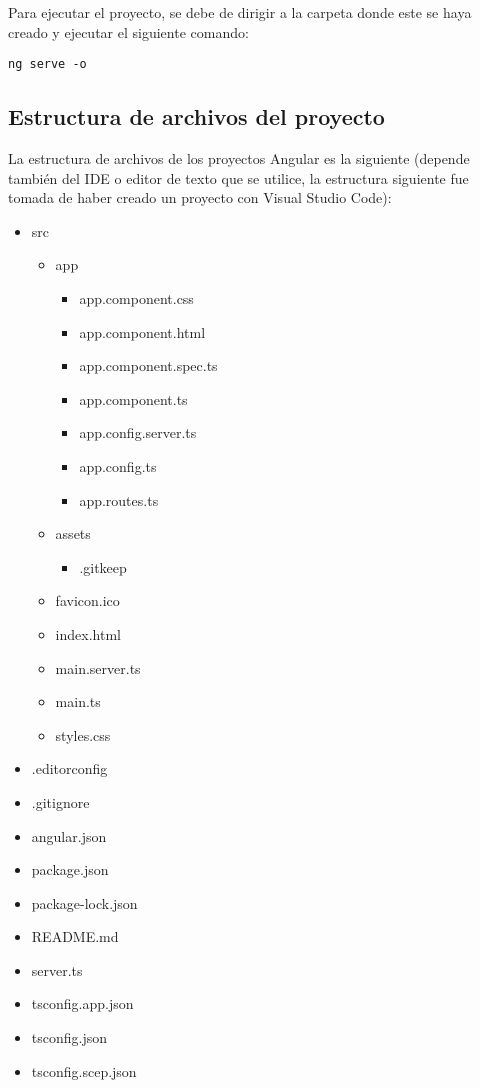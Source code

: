Para ejecutar el proyecto, se debe de dirigir a la carpeta donde este se haya creado y ejecutar el siguiente comando:
\begin{lstlisting}[style=bash]
ng serve -o
\end{lstlisting}


\subsection{Estructura de archivos del proyecto}

La estructura de archivos de los proyectos Angular es la siguiente (depende también del IDE o  editor de texto que se utilice, la estructura siguiente fue tomada de haber creado un proyecto con Visual Studio Code):
\begin{itemize}
    \item src
    \begin{itemize}
        \item app
        \begin{itemize}
            \item app.component.css
            \item app.component.html
            \item app.component.spec.ts
            \item app.component.ts
            \item app.config.server.ts
            \item app.config.ts
            \item app.routes.ts
        \end{itemize}
        \item assets
        \begin{itemize}
            \item .gitkeep
        \end{itemize}
        \item favicon.ico
        \item index.html
        \item main.server.ts
        \item main.ts
        \item styles.css
    \end{itemize}
    \item .editorconfig
    \item .gitignore
    \item angular.json
    \item package.json
    \item package-lock.json
    \item README.md
    \item server.ts
    \item tsconfig.app.json
    \item tsconfig.json
    \item tsconfig.scep.json
\end{itemize}

